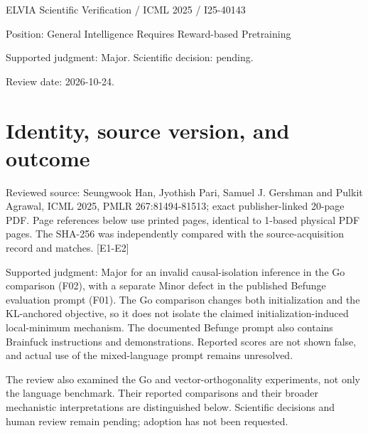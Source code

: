 \documentclass[10pt]{article}
\begin{document}
ELVIA Scientific Verification / ICML 2025 / I25-40143\par
Position: General Intelligence Requires Reward-based Pretraining\par
Supported judgment: Major. Scientific decision: pending.\par
Review date: 2026-10-24.\par
\section*{Identity, source version, and outcome}
Reviewed source: Seungwook Han, Jyothish Pari, Samuel J. Gershman and Pulkit Agrawal, ICML 2025, PMLR 267:81494-81513; exact publisher-linked 20-page PDF. Page references below use printed pages, identical to 1-based physical PDF pages. The SHA-256 was independently compared with the source-acquisition record and matches. [E1-E2]\par
Supported judgment: Major for an invalid causal-isolation inference in the Go comparison (F02), with a separate Minor defect in the published Befunge evaluation prompt (F01). The Go comparison changes both initialization and the KL-anchored objective, so it does not isolate the claimed initialization-induced local-minimum mechanism. The documented Befunge prompt also contains Brainfuck instructions and demonstrations. Reported scores are not shown false, and actual use of the mixed-language prompt remains unresolved.\par
The review also examined the Go and vector-orthogonality experiments, not only the language benchmark. Their reported comparisons and their broader mechanistic interpretations are distinguished below. Scientific decisions and human review remain pending; adoption has not been requested.\par
\end{document}
